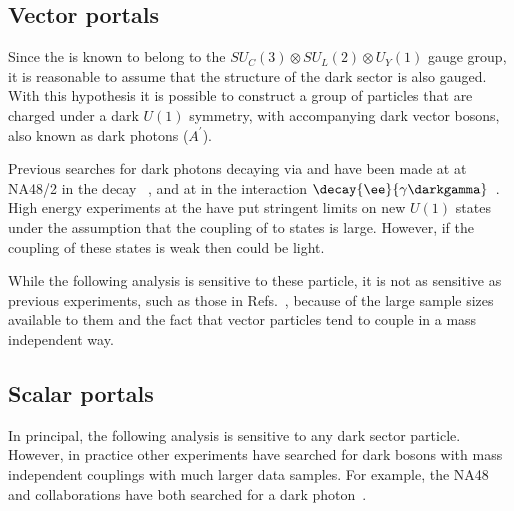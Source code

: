 \subsection{Vector portals}
Since the \sm is known to belong to the
$SU_C(3)\otimes SU_L(2)\otimes U_Y(1)$
gauge group, it is reasonable to assume that the structure of the dark sector is also gauged.
With this hypothesis it is possible to construct a group of particles that are charged under a
dark $U(1)$ symmetry, with accompanying dark vector bosons, also known as dark photons
($A^\prime$).

Previous searches for dark photons decaying via \decay{\darkgamma}{\ee} and
\decay{\darkgamma}{\mumu} have been made at
at NA48/2 in the decay \decay{\piz}{\gamma\darkgamma}~\cite{CERNNA48/2:2015lha}, and at \babar in
the interaction $\decay{\ee}{\gamma\darkgamma}$~\cite{Lees:2014xha}.
High energy \lhc experiments at the \lhc have put stringent limits on new $U(1)$ states under the
assumption that the coupling of \darkgamma to \sm states is large.
However, if the coupling of these states is weak then \darkgamma could be light.

While the following analysis is sensitive to these particle, it is not as sensitive as previous
experiments, such as those in Refs.~\cite{CERNNA48/2:2015lha,Lees:2014xha}, because of the large
sample sizes available to them and the fact that vector particles tend to couple in a mass
independent way.








\subsection{Scalar portals}

In principal, the following analysis is sensitive to any dark sector particle.
However, in practice other experiments have searched for dark bosons with mass independent
couplings with much larger data samples.
For example, the NA48 and \babar collaborations have both searched for a
dark photon~\cite{CERNNA48/2:2015lha,Lees:2014xha}.







